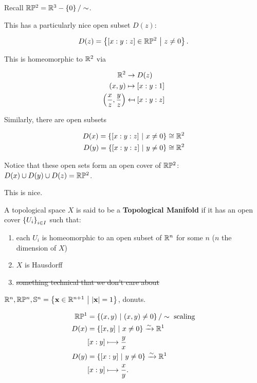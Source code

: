\documentclass[12pt, twosided]{article}
\begin{document}
\begin{exa}
  Recall \(\mathbb{R}\mathbb{P}^2 = \mathbb{R}^3 - \left\{ 0 \right\} / \sim\).

  This has a particularly nice open subset \(D(z)\):

  \begin{align*}
    D(z) = \left\{ [x : y : z] \in \mathbb{R}\mathbb{P}^2 \ \middle\vert\  z \neq 0 \right\}.
  \end{align*}

  This is homeomorphic to \(\mathbb{R}^2\) via

  \begin{align*}
    \mathbb{R}^2 &\to D(z) \\
    (x, y) &\mapsto [x: y : 1] \\
    \left(\frac{x}{z}, \frac{y}{z}\right) &\mapsfrom [x: y: z]
  \end{align*}

  Similarly, there are open subsets

  \begin{align*}
    D(x) = \left\{ [x: y: z] \ \middle\vert\  x \neq 0 \right\} \cong \mathbb{R}^2 \\
    D(y) = \left\{ [x: y: z] \ \middle\vert\  y \neq 0 \right\} \cong \mathbb{R}^2 \\
  \end{align*}

  Notice that these open sets form an open cover of \(\mathbb{R}\mathbb{P}^2\): \(D(x) \cup D(y) \cup D(z) = \mathbb{R}\mathbb{P}^2\).

  This is nice.
\end{exa}

\begin{df}
  A topological space \(X\) is said to be a \textbf{Topological Manifold} if it has an open cover \(\left\{ U_i \right\}_{i \in I}\) such that:
  \begin{enumerate}
  \item each \(U_i\) is homeomorphic to an open subset of \(\mathbb{R}^n\) for some \(n\) (\(n\) the dimension of \(X\))
  \item \(X\) is Hausdorff 
  \item \sout{something technical that we don't care about}
  \end{enumerate}
\end{df}

\begin{exa}
  \(\mathbb{R}^n, \mathbb{R}\mathbb{P}^n, \mathbb{S}^n = \left\{ \mathbf{x} \in \mathbb{R}^{n+1} \ \middle\vert\  |\mathbf{x} | = 1 \right\}\), donuts.
\end{exa}


\begin{exa}
  \begin{align*}
    \mathbb{R}\mathbb{P}^1 &= \left\{ (x, y) \ \middle\vert\  (x, y) \neq 0 \right\} / \sim \text{ scaling} \\
    D(x) &= \left\{ [x, y] \ \middle\vert\  x \neq 0 \right\} \xrightarrow{\sim} \mathbb{R}^1 \\
           & [x:y] \longmapsto \frac{y}{x} \\
    D(y) &= \left\{ [x:y] \ \middle\vert\  y \neq 0 \right\} \xrightarrow{\sim} \mathbb{R}^1 \\
           & [x:y] \longmapsto \frac{x}{y}.
  \end{align*}
\end{exa}
\end{document}
